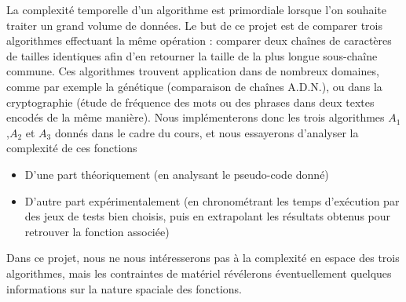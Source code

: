 La complexité temporelle d'un algorithme est primordiale lorsque l'on souhaite traiter un grand volume de données.
Le but de ce projet est de comparer trois algorithmes effectuant la même opération : comparer deux chaînes de caractères de tailles identiques afin d'en retourner la taille de la plus longue sous-chaîne commune.
Ces algorithmes trouvent application dans de nombreux domaines, comme par exemple la génétique (comparaison de chaînes A.D.N.), ou dans la cryptographie (étude de fréquence des mots ou des phrases dans deux textes encodés de la même manière).
Nous implémenterons donc les trois algorithmes $A_1$,$A_2$ et $A_3$ donnés dans le cadre du cours, et nous essayerons d'analyser la complexité de ces fonctions
\begin{itemize}
 \item D'une part théoriquement (en analysant le pseudo-code donné)
 \item D'autre part expérimentalement (en chronométrant les temps d'exécution par des jeux de tests bien choisis, puis en extrapolant les résultats obtenus pour retrouver la fonction associée)
\end{itemize}

Dans ce projet, nous ne nous intéresserons pas à la complexité en espace des trois algorithmes, mais les contraintes de matériel révélerons éventuellement quelques informations sur la nature spaciale des fonctions.